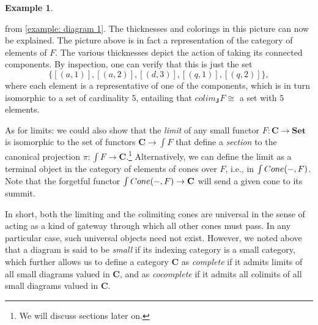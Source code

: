 \documentclass[a4paper]{book}
\theoremstyle{definition}
\newtheorem{example}{Example}[section]
\theoremstyle{definition}
\theoremstyle{definition}
\theoremstyle{theorem}
\theoremstyle{definition}
\begin{document}
\begin{example}
\begin{center}
	\end{center} 
from \ref{example: diagram 1}.
The thicknesses and colorings in this picture can now be explained. The picture above is in fact a representation of the category of elements of $F$. The various thicknesses depict the action of taking its connected components. By inspection, one can verify that this is just the set 
\begin{equation*} \{[(a,1)], [(a,2)], [(d,3)], [(q,1)], [(q,2)]\},
\end{equation*} 
where each element is a representative of one of the components, which is in turn isomorphic to a set of cardinality $5$, entailing that $colim_{\textbf{J}} F \cong$ a set with $5$ elements. \par 
As for limits: we could also show that the \textit{limit} of any small functor $F: \textbf{C} \rightarrow \textbf{Set}$ is isomorphic to the set of functors $\textbf{C} \rightarrow \int F$ that define a \textit{section} to the canonical projection $\pi: \int F \rightarrow \textbf{C}$.\footnote{We will discuss sections later on.} Alternatively, we can define the limit as a terminal object in the category of elements of cones over $F$, i.e., in $\int Cone(\--,F)$. Note that the forgetful functor $\int Cone(\--, F) \rightarrow \textbf{C}$ will send a given cone to its summit. \par 
 In short, both the limiting and the colimiting cones are universal in the sense of acting as a kind of gateway through which all other cones must pass. In any particular case, such universal objects need not exist. However, we noted above that a diagram is said to be \textit{small} if its indexing category is a small category, which further allows us to define a category $\textbf{C}$ as \textit{complete}  if it admits limits of all small diagrams valued in \textbf{C}, and as \textit{cocomplete}  if it admits all colimits of all small diagrams valued in \textbf{C}.      
\end{example}
\end{document}
